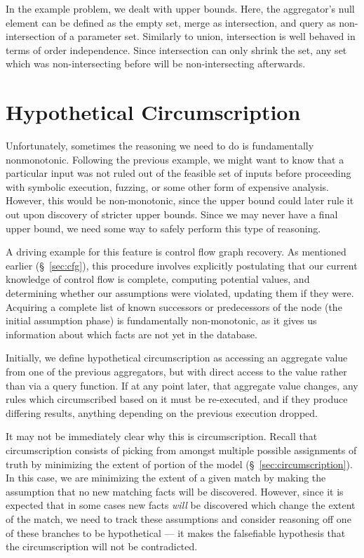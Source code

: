 In the example problem, we dealt with upper bounds.
Here, the aggregator's null element can be defined as the empty set, merge as intersection, and query as non-intersection of a parameter set.
Similarly to union, intersection is well behaved in terms of order independence.
Since intersection can only shrink the set, any set which was non-intersecting before will be non-intersecting afterwards.

\section{Hypothetical Circumscription}
\label{sec:hypcirc}
Unfortunately, sometimes the reasoning we need to do is fundamentally nonmonotonic.
Following the previous example, we might want to know that a particular input was not ruled out of the feasible set of inputs before proceeding with symbolic execution, fuzzing, or some other form of expensive analysis.
However, this would be non-monotonic, since the upper bound could later rule it out upon discovery of stricter upper bounds.
Since we may never have a final upper bound, we need some way to safely perform this type of reasoning.

A driving example for this feature is control flow graph recovery.
As mentioned earlier (\S~\ref{sec:cfg}), this procedure involves explicitly postulating that our current knowledge of control flow is complete, computing potential values, and determining whether our assumptions were violated, updating them if they were.
Acquiring a complete list of known successors or predecessors of the node (the initial assumption phase) is fundamentally non-monotonic, as it gives us information about which facts are not yet in the database.

Initially, we define hypothetical circumscription as accessing an aggregate value from one of the previous aggregators, but with direct access to the value rather than via a query function.
If at any point later, that aggregate value changes, any rules which circumscribed based on it must be re-executed, and if they produce differing results, anything depending on the previous execution dropped.

It may not be immediately clear why this is circumscription.
Recall that circumscription consists of picking from amongst multiple possible assignments of truth by minimizing the extent of portion of the model (\S~\ref{sec:circumscription}).
In this case, we are minimizing the extent of a given match by making the assumption that no new matching facts will be discovered.
However, since it is expected that in some cases new facts \emph{will} be discovered which change the extent of the match, we need to track these assumptions and consider reasoning off one of these branches to be hypothetical --- it makes the falsefiable hypothesis that the circumscription will not be contradicted.

